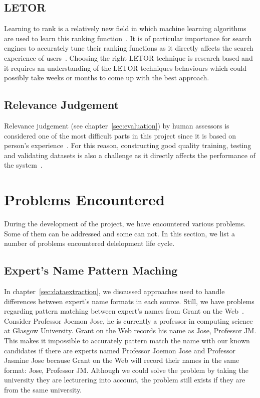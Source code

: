 \subsection{LETOR}
Learning to rank is a relatively new
field in which machine learning algorithms are used to learn this ranking function~\cite{yahooLETOR}.
It is of particular importance for search engines to accurately tune their ranking functions as
it directly affects the search experience of users~\cite{yahooLETOR}.
Choosing the right LETOR technique is research based and it requires an 
understanding of the LETOR techniques behaviours which could possibly take weeks or months to come up with the best approach.

\subsection{Relevance Judgement}\label{sec:relevanceJudgement}
Relevance judgement (see chapter~\ref{sec:evaluation}) by human assessors is considered one of the most difficult parts in this project 
since it is based on person's experience~\cite{jjtextclassification}.
For this reason, constructing good quality training, testing and validating datasets is also a challenge as it directly affects the performance of 
the system~\cite{craig}.


\section{Problems Encountered}\label{sec:problems}
During the development of the project, we have encountered various problems. Some of them can be addressed and some can not. In this section, we 
list a number of problems encountered delelopment life cycle.

\subsection{Expert's Name Pattern Maching}
In chapter~\ref{sec:dataextraction}, we discussed approaches used to handle differences between expert's name formats in each source. 
Still, we have problems regarding pattern matching between expert's names from Grant on the Web~\cite{gow}. Consider Professor Joemon Jose,
he is currently a professor in computing science at Glasgow University. Grant on the Web records his name as Jose, Professor JM.
This makes it impossible to accurately pattern match the name with our known candidates if there are experts named Professor Joemon Jose and 
Professor Jasmine Jose because Grant on the Web will record their names in the same format: Jose, Professor JM. Although we could solve the problem by taking 
the university they are lecturering into account, the problem still exists if they are from the same university.

